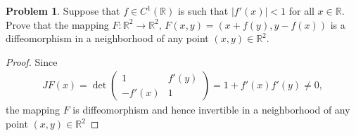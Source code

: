 \documentclass[11pt]{article}
\theoremstyle{definition}
\newtheorem{problem}{Problem}
\theoremstyle{definition}
\begin{document}
\medskip

\begin{problem}
Suppose that $f\in C^1(\mathbb{R})$ is such that $|f'(x)|<1$ for all $x\in\mathbb{R}$. Prove that the mapping $F:\mathbb{R}^2\to\mathbb{R}^2$,
$F(x,y)=(x+f(y), y-f(x))$ is a diffeomorphism in a neighborhood of any point $(x,y)\in\mathbb{R}^2$.
\end{problem}
\begin{proof}
Since
\begin{align*}
    JF(x) = \det \begin{pmatrix}
        1 & f'(y) \\
        - f'(x) & 1
    \end{pmatrix} = 1 + f'(x)f'(y) \neq 0,
\end{align*}
the mapping $F$ is diffeomorphism and hence invertible in a neighborhood of any point $(x,y) \in \mathbb{R}^2$
\end{proof}

\medskip
\end{document}

